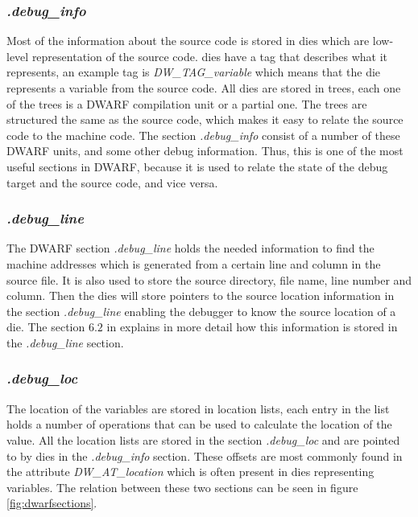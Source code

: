 \subsubsection{\emph{.debug\_info}}
Most of the information about the source code is stored in \glspl{die} which are low-level representation of the source code.
\glspl{die} have a tag that describes what it represents, an example tag is \emph{DW\_TAG\_variable} which means that the \gls{die} represents a variable from the source code.
All \glspl{die} are stored in trees, each one of the trees is a \gls{DWARF} compilation unit or a partial one.
The trees are structured the same as the source code, which makes it easy to relate the source code to the machine code.
The section \emph{.debug\_info} consist of a number of these \gls{DWARF} units, and some other debug information.
Thus, this is one of the most useful sections in \gls{DWARF}, because it is used to relate the state of the debug target and the source code, and vice versa.


\subsubsection{\emph{.debug\_line}}
The \gls{DWARF} section \emph{.debug\_line} holds the needed information to find the machine addresses which is generated from a certain line and column in the source file.
It is also used to store the source directory, file name, line number and column.
Then the \glspl{die} will store pointers to the source location information in the section \emph{.debug\_line} enabling the debugger to know the source location of a \gls{die}.
The section $6.2$ in \cite{dwarf} explains in more detail how this information is stored in the \emph{.debug\_line} section.


\subsubsection{\emph{.debug\_loc}}
The location of the variables are stored in location lists, each entry in the list holds a number of operations that can be used to calculate the location of the value.
All the location lists are stored in the section \emph{.debug\_loc} and are pointed to by \glspl{die} in the \emph{.debug\_info} section.
These offsets are most commonly found in the attribute \emph{DW\_AT\_location} which is often present in \glspl{die} representing variables.
The relation between these two sections can be seen in figure \ref{fig:dwarfsections}.


